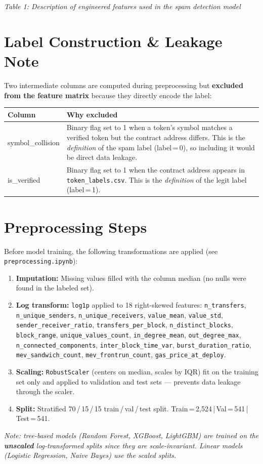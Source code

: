 \documentclass[11pt, a4paper]{article}
\begin{document}
\vspace{1em}
\begin{center}
\textit{Table 1: Description of engineered features used in the spam detection model}
\end{center}

\section{Label Construction \& Leakage Note}

Two intermediate columns are computed during preprocessing but \textbf{excluded from the feature matrix}
because they directly encode the label:

\vspace{0.5em}
\begin{tabular}{>{\ttfamily}p{3.8cm} p{10.4cm}}
\toprule
\normalfont\textbf{Column} & \textbf{Why excluded} \\
\midrule
symbol\_collision & Binary flag set to 1 when a token's symbol matches a verified token but the contract address differs. This is the \emph{definition} of the spam label (label\,=\,0), so including it would be direct data leakage. \\[4pt]
is\_verified & Binary flag set to 1 when the contract address appears in \texttt{token\_labels.csv}. This is the \emph{definition} of the legit label (label\,=\,1). \\
\bottomrule
\end{tabular}

\section{Preprocessing Steps}

Before model training, the following transformations are applied (see \texttt{preprocessing.ipynb}):

\begin{enumerate}
  \item \textbf{Imputation:} Missing values filled with the column median (no nulls were found in the labeled set).
  \item \textbf{Log transform:} \texttt{log1p} applied to 18 right-skewed features:
        \texttt{n\_transfers}, \texttt{n\_unique\_senders}, \texttt{n\_unique\_receivers},
        \texttt{value\_mean}, \texttt{value\_std}, \texttt{sender\_receiver\_ratio},
        \texttt{transfers\_per\_block}, \texttt{n\_distinct\_blocks}, \texttt{block\_range},
        \texttt{unique\_values\_count},
        \texttt{in\_degree\_mean}, \texttt{out\_degree\_max}, \texttt{n\_connected\_components},
        \texttt{inter\_block\_time\_var}, \texttt{burst\_duration\_ratio},
        \texttt{mev\_sandwich\_count}, \texttt{mev\_frontrun\_count}, \texttt{gas\_price\_at\_deploy}.
  \item \textbf{Scaling:} \texttt{RobustScaler} (centers on median, scales by IQR) fit on the training set only and applied to validation and test sets --- prevents data leakage through the scaler.
  \item \textbf{Split:} Stratified 70\,/\,15\,/\,15 train\,/\,val\,/\,test split.
        Train\,=\,2,524\,|\,Val\,=\,541\,|\,Test\,=\,541.
\end{enumerate}

\textit{Note: tree-based models (Random Forest, XGBoost, LightGBM) are trained on the \textbf{unscaled} log-transformed splits since they are scale-invariant. Linear models (Logistic Regression, Naive Bayes) use the scaled splits.}
\end{document}
